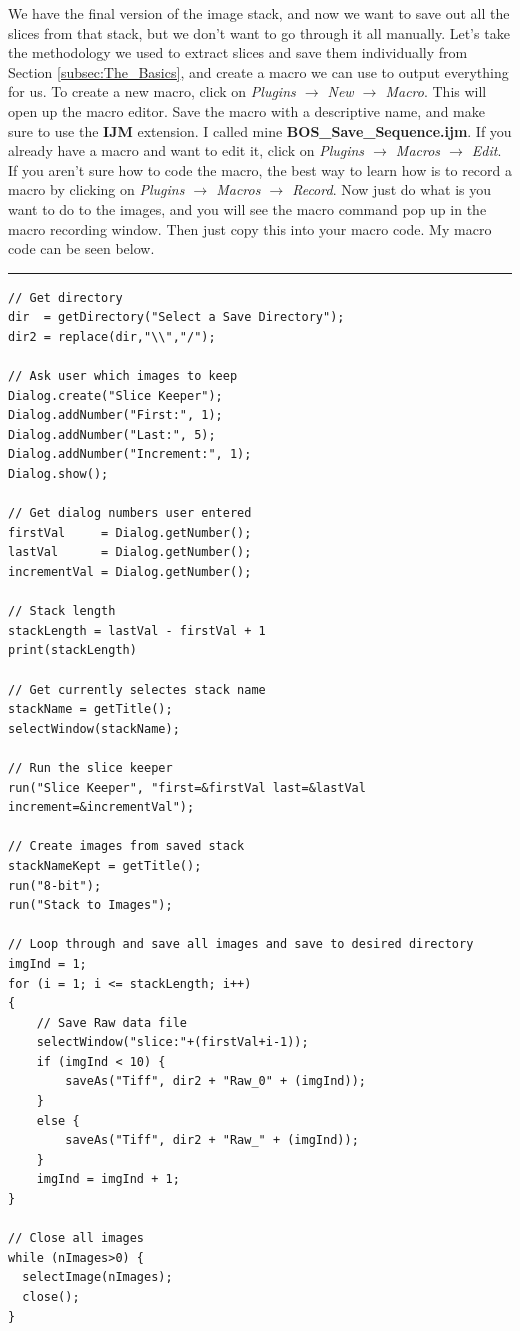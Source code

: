 \documentclass[letterpaper,12pt]{article}
\begin{document}
We have the final version of the image stack, and now we want to save out all the slices from that stack, but we don't want to go through it all manually.  Let's take the methodology we used to extract slices and save them individually from Section \ref{subsec:The_Basics}, and create a macro we can use to output everything for us.  To create a new macro, click on \textcolor{myMagenta}{\textit{Plugins $\rightarrow$ New $\rightarrow$ Macro}}.  This will open up the macro editor.  Save the macro with a descriptive name, and make sure to use the \textbf{IJM} extension.  I called mine \textbf{BOS\_Save\_Sequence.ijm}.  If you already have a macro and want to edit it, click on \textcolor{myMagenta}{\textit{Plugins $\rightarrow$ Macros $\rightarrow$ Edit}}.  If you aren't sure how to code the macro, the best way to learn how is to record a macro by clicking on \textcolor{myMagenta}{\textit{Plugins $\rightarrow$ Macros $\rightarrow$ Record}}.  Now just do what is you want to do to the images, and you will see the macro command pop up in the macro recording window.  Then just copy this into your macro code.  My macro code can be seen below.

\par\noindent\rule{\textwidth}{0.4pt}

\vspace{1em}
\lstset{basicstyle=\large}
\begin{lstlisting}[style=C]
// Get directory
dir  = getDirectory("Select a Save Directory");
dir2 = replace(dir,"\\","/");

// Ask user which images to keep
Dialog.create("Slice Keeper");
Dialog.addNumber("First:", 1);
Dialog.addNumber("Last:", 5);
Dialog.addNumber("Increment:", 1);
Dialog.show();

// Get dialog numbers user entered
firstVal     = Dialog.getNumber();
lastVal      = Dialog.getNumber();
incrementVal = Dialog.getNumber();

// Stack length
stackLength = lastVal - firstVal + 1
print(stackLength)

// Get currently selectes stack name
stackName = getTitle();
selectWindow(stackName);

// Run the slice keeper
run("Slice Keeper", "first=&firstVal last=&lastVal increment=&incrementVal");

// Create images from saved stack
stackNameKept = getTitle();
run("8-bit");
run("Stack to Images");

// Loop through and save all images and save to desired directory
imgInd = 1;
for (i = 1; i <= stackLength; i++)
{
	// Save Raw data file
	selectWindow("slice:"+(firstVal+i-1));
	if (imgInd < 10) {
		saveAs("Tiff", dir2 + "Raw_0" + (imgInd));
	}
	else {
		saveAs("Tiff", dir2 + "Raw_" + (imgInd));
	}
	imgInd = imgInd + 1;
}

// Close all images
while (nImages>0) { 
  selectImage(nImages); 
  close(); 
}
\end{lstlisting}
\end{document}
